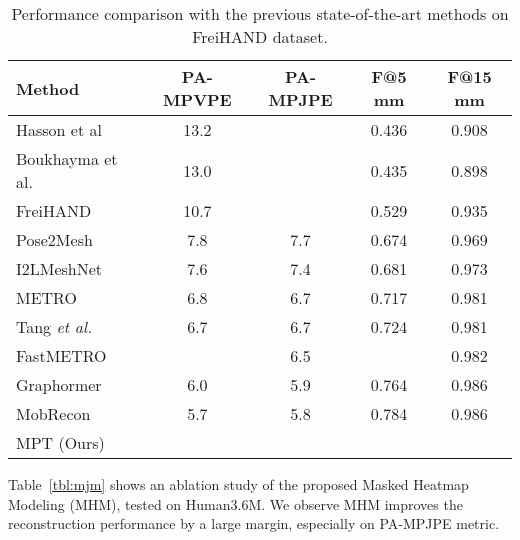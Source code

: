 \begin{table}
\centering
{}	
\caption{Analysis of pre-training data size. We conduct pre-training using different percentage of data, and evaluate the pre-trained MPT on Human3.6M without fine-tuning.}
\label{tbl:num_pt_data}
\vspace{-4mm}
\end{table} \begin{table}[t]
\centering
\begin{tabular}{lcccc}
    \toprule[1.5pt]
	Method  & PA-MPVPE  & PA-MPJPE  & F@5 mm  & F@15 mm \\
	\midrule
	Hasson et al~\cite{hasson2019learning} & 13.2 &  & 0.436 & 0.908\\
	Boukhayma et al.~\cite{boukhayma20193d} & 13.0 &  & 0.435 & 0.898\\
	FreiHAND~\cite{zimmermann2019freihand} & 10.7 &  & 0.529 & 0.935\\
	Pose2Mesh~\cite{Choi_2020_ECCV_Pose2Mesh} & 7.8 & 7.7 & 0.674 & 0.969\\
	I2LMeshNet~\cite{Moon_2020_ECCV_I2L-MeshNet} & 7.6 & 7.4 & 0.681 & 0.973\\
    METRO~\cite{lin2020end}  & 6.8 & 6.7 & 0.717 & 0.981\\
    Tang \textit{et al.}~\cite{tang2021towards}  & 6.7 & 6.7 & 0.724 & 0.981\\
    FastMETRO~\cite{cho2022FastMETRO} &  & 6.5 &  & 0.982\\
    Graphormer~\cite{lin2021mesh}   & 6.0 & 5.9 & 0.764 & 0.986\\
    MobRecon~\cite{MobRecon} & 5.7 & 5.8 & 0.784 & 0.986\\
    \midrule
    MPT (Ours) &  &  &  & \\
	\bottomrule[1.5pt]
\end{tabular}
\caption{Performance comparison with the previous state-of-the-art methods on FreiHAND dataset. }
\label{tbl:compare-hand}
\vspace{-4mm}
\end{table} 


 Table~\ref{tbl:mjm} shows an ablation study of the proposed Masked Heatmap Modeling (MHM), tested on Human3.6M. We observe MHM improves the reconstruction performance by a large margin, especially on PA-MPJPE metric.




